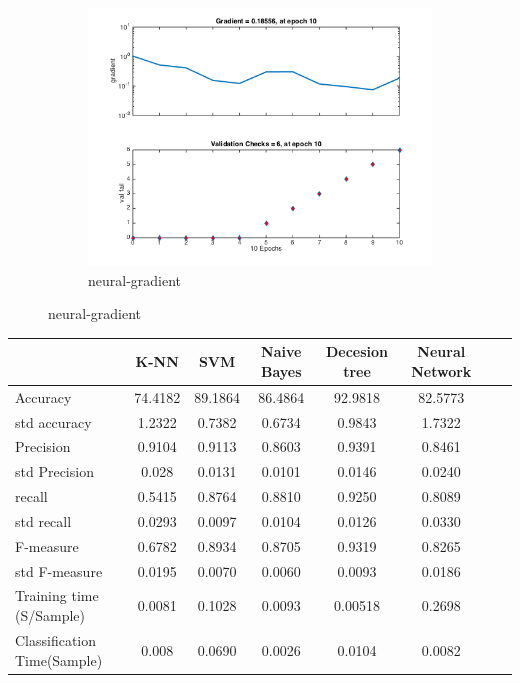 \documentclass[]{article}
\begin{document}
\begin{figure}[p]
	\begin{subfigure}{.5\textwidth}
		\centering
		\includegraphics[width=1\linewidth]{../images-update/1-(4)-neural_gradient.png}
		\caption{neural-gradient}
		\label{fig:sub1}
	\end{subfigure}
	
\end{figure}
\begin{tabular}
	{l*{6}{c}r}   	& K-NN  & SVM & Naive Bayes & Decesion tree & Neural Network \\ \hline
	Accuracy & 74.4182 & 89.1864 & 86.4864 & 92.9818 & 82.5773 \\ 
	std accuracy & 1.2322 & 0.7382 & 0.6734 & 0.9843 & 1.7322 \\
	Precision & 0.9104 & 0.9113 & 0.8603 &0.9391 & 0.8461\\
	std Precision & 0.028 & 0.0131 & 0.0101 & 0.0146 & 0.0240\\
	recall & 0.5415 & 0.8764 & 0.8810 & 0.9250 & 0.8089\\
	std recall & 0.0293 & 0.0097 & 0.0104 & 0.0126 & 0.0330\\
	F-measure & 0.6782 & 0.8934 & 0.8705 & 0.9319 & 0.8265 \\
	std F-measure & 0.0195 & 0.0070 & 0.0060 & 0.0093 & 0.0186 \\
	Training time (S/Sample) &  0.0081 & 0.1028 & 0.0093 & 0.00518 & 0.2698 \\
	Classification Time(Sample) & 0.008 & 0.0690 & 0.0026 & 0.0104 & 0.0082 \\
\end{tabular}
\end{document}
